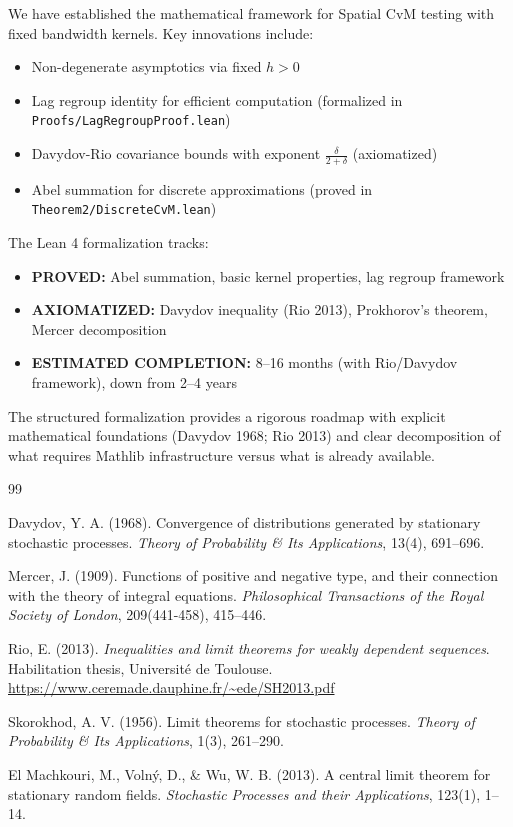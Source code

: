 \documentclass[final,3p,twocolumn,times,authoryear]{elsarticle}
\theoremstyle{definition}
\begin{document}
We have established the mathematical framework for Spatial CvM testing with fixed bandwidth kernels. Key innovations include:

\begin{itemize}
    \item Non-degenerate asymptotics via fixed $h > 0$
    \item Lag regroup identity for efficient computation (formalized in \texttt{Proofs/LagRegroupProof.lean})
    \item Davydov-Rio covariance bounds with exponent $\frac{\delta}{2+\delta}$ (axiomatized)
    \item Abel summation for discrete approximations (proved in \texttt{Theorem2/DiscreteCvM.lean})
\end{itemize}

The Lean 4 formalization tracks:
\begin{itemize}
    \item \textbf{PROVED:} Abel summation, basic kernel properties, lag regroup framework
    \item \textbf{AXIOMATIZED:} Davydov inequality (Rio 2013), Prokhorov's theorem, Mercer decomposition
    \item \textbf{ESTIMATED COMPLETION:} 8--16 months (with Rio/Davydov framework), down from 2--4 years
\end{itemize}

The structured formalization provides a rigorous roadmap with explicit mathematical foundations (Davydov 1968; Rio 2013) and clear decomposition of what requires Mathlib infrastructure versus what is already available.


\begin{thebibliography}{99}

Davydov, Y. A. (1968).
Convergence of distributions generated by stationary stochastic processes.
\textit{Theory of Probability \& Its Applications}, 13(4), 691--696.

Mercer, J. (1909).
Functions of positive and negative type, and their connection with the theory of integral equations.
\textit{Philosophical Transactions of the Royal Society of London}, 209(441-458), 415--446.

Rio, E. (2013).
\textit{Inequalities and limit theorems for weakly dependent sequences}.
Habilitation thesis, Universit\'{e} de Toulouse.\\
\url{https://www.ceremade.dauphine.fr/~ede/SH2013.pdf}

Skorokhod, A. V. (1956).
Limit theorems for stochastic processes.
\textit{Theory of Probability \& Its Applications}, 1(3), 261--290.

El Machkouri, M., Voln\'{y}, D., \& Wu, W. B. (2013).
A central limit theorem for stationary random fields.
\textit{Stochastic Processes and their Applications}, 123(1), 1--14.

\end{thebibliography}
\end{document}
